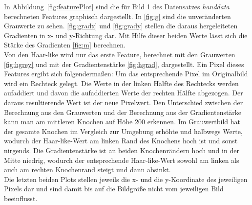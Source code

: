 \documentclass[]{report}
\begin{document}
\begin{enumerate}
					In Abbildung~\ref{fig:featurePlot} sind die für Bild 1 des Datensatzes \textit{handdata} berechneten Features graphisch dargestellt. In \ref{fig:g} sind die unveränderten Grauwerte zu sehen. \ref{fig:gradx} und \ref{fig:grady} stellen die daraus hergeleiteten Gradienten in x- und y-Richtung dar. Mit Hilfe dieser beiden Werte lässt sich die Stärke des Gradienten \ref{fig:m} berechnen. \\
					Von den Haar-like wird nur das erste Feature, berechnet mit den Grauwerten \ref{fig:hgrey} und mit der Gradientenstärke \ref{fig:hgrad}, dargestellt.
					Ein Pixel dieses Features ergibt sich folgendermaßen: Um das entsprechende Pixel im Originalbild wird ein Rechteck gelegt. Die Werte in der linken Hälfte des Rechtecks werden aufaddiert und davon die aufaddierten Werte der rechten Hälfte abgezogen. Der daraus resultierende Wert ist der neue Pixelwert. Den Unterschied zwischen der Berechnung aus den Grauwerten und der Berechnung aus der Gradientenstärke kann man am mittleren Knochen auf Höhe 200 erkennen. Im Grauwertbild hat der gesamte Knochen im Vergleich zur Umgebung erhöhte und halbwegs Werte, wodurch der Haar-like-Wert am linken Rand des Knochens hoch ist und sonst nirgends. Die Gradientenstärke ist an beiden Knochenrändern hoch und in der Mitte niedrig, wodurch der entsprechende Haar-like-Wert sowohl am linken als auch am rechten Knochenrand steigt und dann absinkt.
					\\
					Die letzten beiden Plots stellen jeweils die x- und die y-Koordinate des jeweiligen Pixels dar und sind damit bis auf die Bildgröße nicht vom jeweiligen Bild beeinflusst.
						

\end{enumerate}
\end{document}
